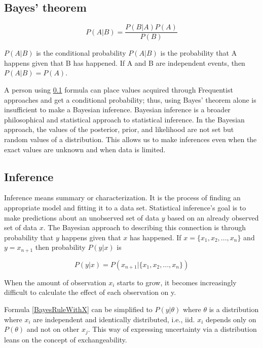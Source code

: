\subsection{Bayes' theorem}\label{BayesianTheorem}
\begin{equation}
P(A|B) = \frac{P(B|A)P(A)}{P(B)}
\end{equation}

$P(A|B)$ is the conditional probability \cite{Gut2005ProbabilityAG} $P(A|B)$ is the probability that A happens given that B has happened. If A and B are independent events, then $P(A|B) = P(A)$. \cite{Gut2005ProbabilityAG}

A person using \ref{BayesianTheorem} formula can place values acquired through Frequentist approaches and get a conditional probability; thus, using Bayes' theorem alone is insufficient to make a Bayesian inference. Bayesian inference is a broader philosophical and statistical approach to statistical inference.\cite{Mcelreath2015StatisticalRA} In the Bayesian approach, the values of the posterior, prior, and likelihood are not set but random values of a distribution.\cite{Gut2005ProbabilityAG} This allows us to make inferences even when the exact values are unknown and when data is limited.

\subsection{Inference}\label{Inference}

Inference means summary or characterization.\cite{Robert2007TheBC} It is the process of finding an appropriate model and fitting it to a data set.\cite{Gel2014BayesianDA} Statistical inference's goal is to make predictions about an unobserved set of data $y$ based on an already observed set of data $x$.\cite{Lindley1990The1W}\cite{Gel2014BayesianDA} The Bayesian approach to describing this connection is through probability that $y$ happens given that $x$ has happened. If $x = \{x_1, x_2, ..., x_n \}$ and $y = x_{n + 1}$ then probability $P(y|x)$ is

\begin{equation}\label{BayesRuleWithX}
P(y|x) = P(x_{n + 1}|\{x_1, x_2, ..., x_n \})
\end{equation}

When the amount of observation $x_i$ starts to grow, it becomes increasingly difficult to calculate the effect of each observation on y. 

Formula \ref{BayesRuleWithX} can be simplified to $P(y|\theta)$ where $\theta$ is a distribution where $x_i$ are independent and identically distributed, i.e., iid. $x_i$ depends only on $P(\theta)$ and not on other $x_j$.\cite{Lindley1990The1W} This way of expressing uncertainty via a distribution leans on the concept of exchangeability.\cite{Gel2014BayesianDA}

